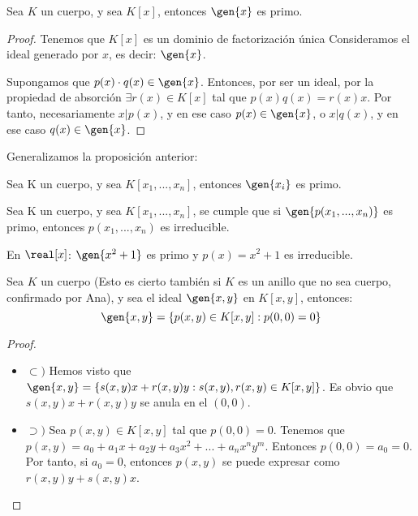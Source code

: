 \begin{prop}
	Sea $K$ un cuerpo, y sea $K[x]$, entonces $\gen{x}$ es primo.
\end{prop}
\begin{proof}
	Tenemos que $K[x]$ es un dominio de factorización única  Consideramos el ideal generado por $x$, es decir: $\gen{x}$.


	Supongamos que $p(x)\cdot q(x) \in \gen{x}$. Entonces, por ser un ideal, por la propiedad de absorción $\exists r(x) \in K[x]$ tal que $p(x) q(x)=r(x) x$. Por tanto, necesariamente $x|p(x)$, y en ese caso $p(x) \in \gen{x}$, o $x|q(x)$, y en ese caso $q(x) \in \gen{x}$.
\end{proof}

Generalizamos la proposición anterior:
\begin{prop}
	Sea K un cuerpo, y sea $K[x_1,...,x_n]$, entonces $\gen{x_i}$ es primo.
\end{prop}

\begin{prop}
	Sea K un cuerpo, y sea $K[x_1,...,x_n]$, se cumple que si $\gen{p(x_1,...,x_n)}$ es primo,  entonces $p(x_1,...,x_n)$ es irreducible.
\end{prop}

\begin{example}
	En $\real[x]$: $\gen{x^2+1}$ es primo y $p(x)=x^2+1$ es irreducible.
\end{example}

\begin{prop}\label{prop:def_idealGeneradoxy}
	Sea $K$ un cuerpo (Esto es cierto también si $K$ es un anillo que no sea cuerpo, confirmado por Ana), y sea el ideal $\gen{x,y}$ en $K[x,y]$, entonces:
	$$\gen{x,y}=\{p(x,y)\in K[x,y]:p(0,0)=0 \}$$
\end{prop}

\begin{proof}
	\begin{itemize}
		\item $\subset)$ Hemos visto que $\gen{x,y}=\{s(x,y) x+r(x,y) y: s(x,y),r(x,y) \in K[x,y] \}$. Es obvio que $s(x,y) x+r(x,y) y$ se anula en el $(0,0)$.
		\item $\supset)$ Sea $p(x,y) \in K[x,y]$ tal que $p(0,0)=0$. Tenemos que $p(x,y)=a_0+a_1x+a_2y+a_3x^2+...+a_nx^ny^m$. Entonces $p(0,0)=a_0=0$. Por tanto, si $a_0=0$, entonces $p(x,y)$ se puede expresar como $r(x,y)y+s(x,y)x$.
	\end{itemize}
\end{proof}

